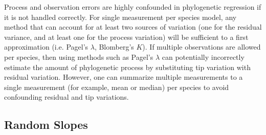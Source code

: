 \documentclass[12pt]{article}
\begin{document}
Process and observation errors are highly confounded in phylogenetic regression if it is not handled correctly. 
For single measurement per species model, any method that can account for at least two sources of variation (one for the residual variance, and at least one for the process variation) will be sufficient to a first approximation (i.e. Pagel's $\lambda$, Blomberg's $K$).
If multiple observations are allowed per species, then using methods such as Pagel's $\lambda$ can potentially incorrectly estimate the amount of phylogenetic process by substituting tip variation with residual variation. 
However, one can summarize multiple measurements to a single measurement (for example, mean or median) per species to avoid confounding residual and tip variations.

\subsection{Random Slopes}
\end{document}
